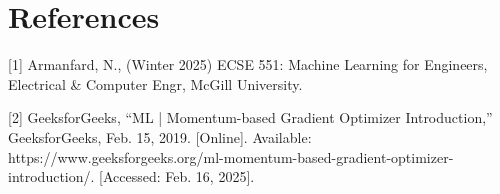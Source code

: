 \documentclass{article}
\begin{document}
\section*{References}

\medskip

\small

[1] Armanfard, N., (Winter 2025) ECSE 551: Machine Learning for Engineers, Electrical & Computer Engr, McGill University.

[2] GeeksforGeeks, “ML | Momentum-based Gradient Optimizer Introduction,” GeeksforGeeks, Feb. 15, 2019. [Online]. Available: https://www.geeksforgeeks.org/ml-momentum-based-gradient-optimizer-introduction/. [Accessed: Feb. 16, 2025].
\end{document}

